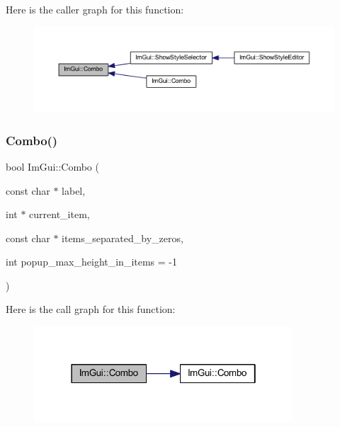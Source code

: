 Here is the caller graph for this function\+:
\nopagebreak
\begin{figure}[H]
\begin{center}
\leavevmode
\includegraphics[width=350pt]{namespace_im_gui_aa2979368da5b9e98d368449b36d166b2_icgraph}
\end{center}
\end{figure}
\mbox{\label{namespace_im_gui_ab982779804105fdc57355868ab531cad}} 
\subsubsection{\texorpdfstring{Combo()}{Combo()}\hspace{0.1cm}{\footnotesize\ttfamily [2/3]}}
{\footnotesize\ttfamily bool Im\+Gui\+::\+Combo (\begin{DoxyParamCaption}\item[{const char $\ast$}]{label,  }\item[{int $\ast$}]{current\+\_\+item,  }\item[{const char $\ast$}]{items\+\_\+separated\+\_\+by\+\_\+zeros,  }\item[{int}]{popup\+\_\+max\+\_\+height\+\_\+in\+\_\+items = {\ttfamily -\/1} }\end{DoxyParamCaption})}

Here is the call graph for this function\+:
\nopagebreak
\begin{figure}[H]
\begin{center}
\leavevmode
\includegraphics[width=274pt]{namespace_im_gui_ab982779804105fdc57355868ab531cad_cgraph}
\end{center}
\end{figure}
\mbox{\label{namespace_im_gui_ae667a68f13233556aa1de9f672dd3f25}} 
